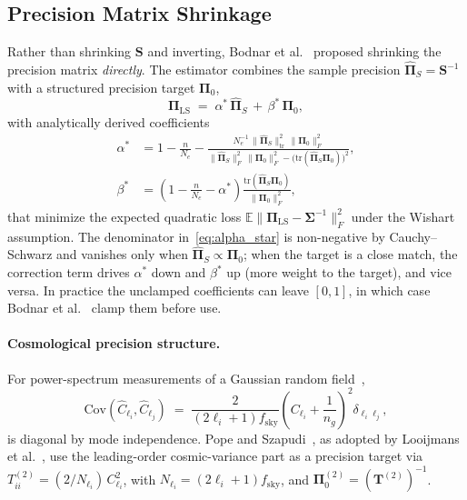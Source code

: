 \subsection{Precision Matrix Shrinkage}
\label{sec:precision_estimation}

Rather than shrinking $\mathbf{S}$ and inverting, Bodnar et al.~\cite{bodnar2016direct} proposed shrinking the precision matrix \emph{directly}. The estimator combines the sample precision $\hat{\boldsymbol{\Pi}}_S = \mathbf{S}^{-1}$ with a structured precision target $\boldsymbol{\Pi}_0$,
\begin{equation}
\label{eq:direct_precision}
\boldsymbol{\Pi}_{\mathrm{LS}} \;=\; \alpha^*\,\hat{\boldsymbol{\Pi}}_S \,+\, \beta^*\,\boldsymbol{\Pi}_0,
\end{equation}
with analytically derived coefficients
\begin{align}
\label{eq:alpha_star}
\alpha^* &= 1 - \frac{n}{N_e} - \frac{N_e^{-1}\,\|\hat{\boldsymbol{\Pi}}_S\|_{\mathrm{tr}}^2\,\|\boldsymbol{\Pi}_0\|_F^2}{\|\hat{\boldsymbol{\Pi}}_S\|_F^2\,\|\boldsymbol{\Pi}_0\|_F^2 - \bigl(\mathrm{tr}(\hat{\boldsymbol{\Pi}}_S \boldsymbol{\Pi}_0)\bigr)^2}, \\
\label{eq:beta_star}
\beta^* &= \left(1 - \frac{n}{N_e} - \alpha^*\right)\frac{\mathrm{tr}(\hat{\boldsymbol{\Pi}}_S \boldsymbol{\Pi}_0)}{\|\boldsymbol{\Pi}_0\|_F^2},
\end{align}
that minimize the expected quadratic loss $\mathbb{E}\|\boldsymbol{\Pi}_{\mathrm{LS}} - \boldsymbol{\Sigma}^{-1}\|_F^2$ under the Wishart assumption. The denominator in~\eqref{eq:alpha_star} is non-negative by Cauchy--Schwarz and vanishes only when $\hat{\boldsymbol{\Pi}}_S \propto \boldsymbol{\Pi}_0$; when the target is a close match, the correction term drives $\alpha^*$ down and $\beta^*$ up (more weight to the target), and vice versa. In practice the unclamped coefficients can leave $[0,1]$, in which case Bodnar et al.~\cite{bodnar2016direct} clamp them before use.

\paragraph{Cosmological precision structure.}
For power-spectrum measurements of a Gaussian random field~\cite{hamilton2006measuring},
\begin{equation}
\label{eq:cosmo_cov}
\mathrm{Cov}(\hat{C}_{\ell_i}, \hat{C}_{\ell_j}) \;=\; \frac{2}{(2\ell_i+1)f_{\mathrm{sky}}}\!\left(C_{\ell_i} + \frac{1}{n_g}\right)^{\!2}\!\delta_{\ell_i\ell_j},
\end{equation}
is diagonal by mode independence. Pope and Szapudi~\cite{pope2008shrinkage}, as adopted by Looijmans et al.~\cite{looijmans2024comparison}, use the leading-order cosmic-variance part as a precision target via $T^{(2)}_{ii} = (2/N_{\ell_i})\,C_{\ell_i}^2$, with $N_{\ell_i} = (2\ell_i+1)f_{\mathrm{sky}}$, and $\boldsymbol{\Pi}_0^{(2)} = (\mathbf{T}^{(2)})^{-1}$.

